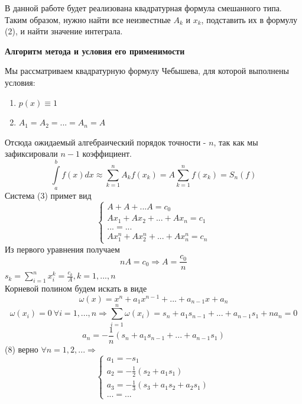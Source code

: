 \documentclass{article}
\begin{document}
	В данной работе будет реализована квадратурная формула смешанного типа.\\
	Таким образом, нужно найти все неизвестные $A_k$ и $x_k$, подставить их в формулу (2), и найти значение интеграла.
	\begin{center} \textbf{Алгоритм метода и условия его применимости}\end{center}
	Мы рассматриваем квадратурную формулу Чебышева, для которой выполнены условия:
	\begin{enumerate}
		\item $p(x) \equiv 1$
		\item $A_1 = A_2 = ... = A_n = A$
	\end{enumerate}
	Отсюда ожидаемый алгебраический порядок точности - $n$, так как мы зафиксировали $n-1$ коэффициент.
	\begin{equation}
		\int\limits_{a}^{b}f(x)dx \approx \sum_{k=1}^{n}A_kf(x_k) = A\sum_{k=1}^{n}f(x_k) = S_n(f) 
	\end{equation}
	Система (3) примет вид
	\begin{equation}
		\begin{cases}
			A+A+...A = c_0\\
			Ax_1+Ax_2+...+Ax_n = c_1\\
			... = ...\\
			Ax_1^n+Ax_2^n+...+Ax_n^n = c_n
		\end{cases}
	\end{equation}
	Из первого уравнения получаем
	\begin{equation}
		nA = c_0 \Rightarrow A = \frac{c_0}{n}
	\end{equation}
	$s_k = \sum_{i=1}^{n}x_i^k = \frac{c_k}{A}, k = 1, ..., n$\\
	Корневой полином будем искать в виде
	\begin{equation}
		\omega(x) = x^n + a_1x^{n-1} + ... + a_{n-1}x + a_n
	\end{equation}
	$$\omega(x_i) = 0 \ \forall i = 1, ..., n \Rightarrow \sum_{i=1}^{n}\omega(x_i) = s_n + a_1s_{n-1} + ... + a_{n-1}s_1 + na_n = 0$$
	\begin{equation}
		a_n = -\frac{1}{n}(s_n + a_1s_{n-1} + ... + a_{n-1}s_1)
	\end{equation}
	(8) верно $\forall n = 1,2,... \Rightarrow$
	\begin{equation}
		\begin{cases}
			a_1 = -s_1\\
			a_2 = -\frac{1}{2}(s_2 + a_1s_1)\\
			a_3 = -\frac{1}{3}(s_3 + a_1s_2 + a_2s_1)\\
			...=...
		\end{cases}
	\end{equation}
\end{document}
